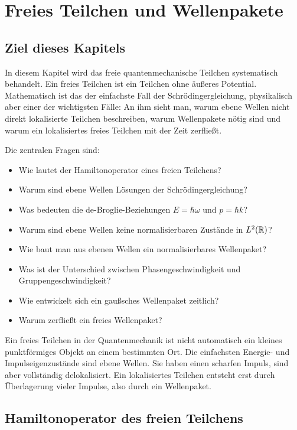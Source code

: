 \chapter{Freies Teilchen und Wellenpakete}

\section{Ziel dieses Kapitels}

In diesem Kapitel wird das freie quantenmechanische Teilchen systematisch behandelt. Ein freies Teilchen ist ein Teilchen ohne äußeres Potential. Mathematisch ist das der einfachste Fall der Schrödingergleichung, physikalisch aber einer der wichtigsten Fälle: An ihm sieht man, warum ebene Wellen nicht direkt lokalisierte Teilchen beschreiben, warum Wellenpakete nötig sind und warum ein lokalisiertes freies Teilchen mit der Zeit zerfließt.

Die zentralen Fragen sind:
\begin{itemize}
    \item Wie lautet der Hamiltonoperator eines freien Teilchens?
    \item Warum sind ebene Wellen Lösungen der Schrödingergleichung?
    \item Was bedeuten die de-Broglie-Beziehungen $E=\hbar\omega$ und $p=\hbar k$?
    \item Warum sind ebene Wellen keine normalisierbaren Zustände in $L^2(\mathbb{R})$?
    \item Wie baut man aus ebenen Wellen ein normalisierbares Wellenpaket?
    \item Was ist der Unterschied zwischen Phasengeschwindigkeit und Gruppengeschwindigkeit?
    \item Wie entwickelt sich ein gaußsches Wellenpaket zeitlich?
    \item Warum zerfließt ein freies Wellenpaket?
\end{itemize}

\begin{conceptbox}
Ein freies Teilchen in der Quantenmechanik ist nicht automatisch ein kleines punktförmiges Objekt an einem bestimmten Ort. Die einfachsten Energie- und Impulseigenzustände sind ebene Wellen. Sie haben einen scharfen Impuls, sind aber vollständig delokalisiert. Ein lokalisiertes Teilchen entsteht erst durch Überlagerung vieler Impulse, also durch ein Wellenpaket.
\end{conceptbox}

\section{Hamiltonoperator des freien Teilchens}

